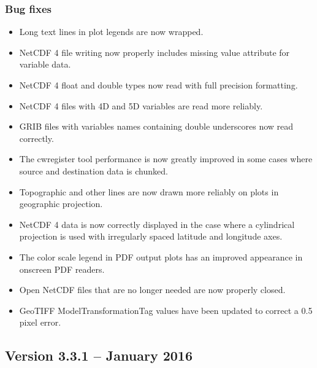 \subsubsection*{ Bug fixes}
\begin{itemize}

  \item Long text lines in plot legends are now wrapped.

  \item NetCDF 4 file writing now properly includes missing value attribute
  for variable data.

  \item NetCDF 4 float and double types now read with full precision formatting.

  \item NetCDF 4 files with 4D and 5D variables are read more reliably.

  \item GRIB files with variables names containing double underscores now read
  correctly.

  \item The cwregister tool performance is now greatly improved in some cases
  where source and destination data is chunked.

  \item Topographic and other lines are now drawn more reliably on plots in
  geographic projection.

  \item NetCDF 4 data is now correctly displayed in the case where a
  cylindrical projection is used with irregularly spaced latitude and longitude
  axes.

  \item The color scale legend in PDF output plots has an improved appearance
  in onscreen PDF readers.

  \item Open NetCDF files that are no longer needed are now properly closed.

  \item GeoTIFF ModelTransformationTag values have been updated to correct
  a 0.5 pixel error.

\end{itemize}


\subsection*{Version 3.3.1 -- January 2016}

